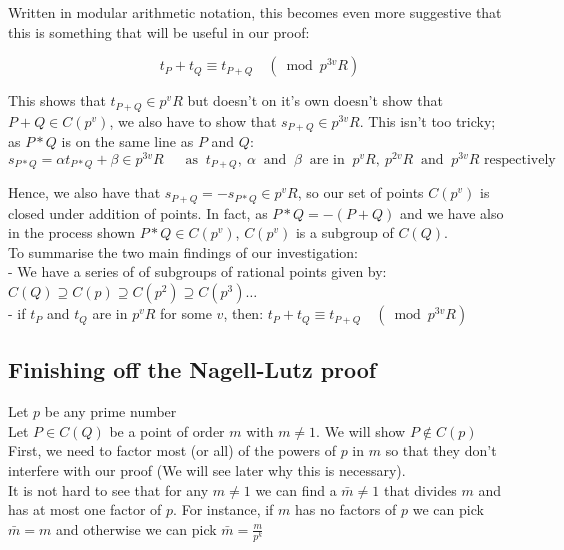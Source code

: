 \documentclass{article}
\begin{document}
Written in modular arithmetic notation, this becomes even more suggestive that this is something that will be useful in our proof: 

\[ t_P + t_Q  \equiv t_{P+Q} \quad (\bmod{p^{3v}R}) \]

This shows that $t_{P+Q} \in p^{v}R$ but doesn't on it's own doesn't show that $P + Q \in C(p^v)$, we also have to show that $s_{P + Q} \in p^{3v}R$. This isn't too tricky; as $P*Q$ is on the same line as $P$ and $Q$:\\

\[s_{P*Q} = \alpha t_{P*Q} + \beta \in p^{3v}R \quad \ \text{ as } \ t_{P+Q}, \ \alpha \ \text{ and } \ \beta \ \text{ are in } \ p^v R, \ p^{2v} R \ \text{ and } \ p^{3v} R  \text{ respectively} \]

Hence, we also have that $s_{P+Q} = -s_{P*Q} \in p^v R$, so our set of points $C(p^v)$ is closed under addition of points. In fact, as $P*Q = - (P+Q)$ and we have also in the process shown $P*Q \in C(p^v)$, $C(p^v)$ is a subgroup of $C(Q)$. \\

To summarise the two main findings of our investigation:\\

- We have a series of of subgroups of rational points given by: $C(Q) \supseteq C(p) \supseteq C(p^2) \supseteq C(p^3) \dots$\\

- if $t_P$ and $t_Q$ are in $p^v R$ for some $v$, then: $t_P + t_Q  \equiv t_{P+Q} \quad (\bmod{p^{3v}R})$

\subsection{Finishing off the Nagell-Lutz proof}

Let $p$ be any prime number\\

Let $P \in C(Q)$ be a point of order $m$ with $m \neq 1$. We will show $P \notin C(p)$ \\

First, we need to factor most (or all) of the powers of $p$ in $m$ so that they don't interfere with our proof (We will see later why this is necessary).\\

It is not hard to see that for any $m \neq 1$ we can find a $\bar{m} \neq 1$ that divides $m$ and has at most one factor of $p$. For instance, if $m$ has no factors of $p$ we can pick $\bar{m} = m$ and otherwise we can pick $\bar{m} = \frac{m}{p^k}$
\end{document}
